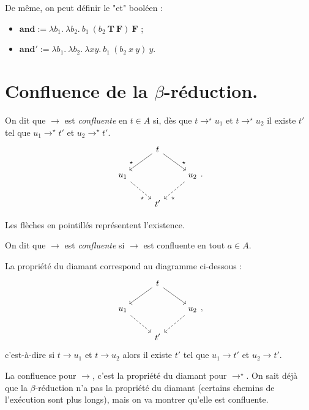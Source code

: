 \documentclass[./main]{subfiles}
\begin{document}
  De même, on peut définir le "et" booléen :
  \begin{itemize}
    \item $\mathbf{and} := \lambda b_1. \: \lambda b_2. \: b_1\: (b_2\: \mathbf{T}\: \mathbf{F})\: \mathbf{F}$ ;
    \item $\mathbf{and}' := \lambda b_1. \:\lambda b_2.\: \lambda x y. \: b_1 \: (b_2 \: x \: y) \: y$.
  \end{itemize}

  \section{Confluence de la $\beta$-réduction.}

  \begin{defn}
    On dit que $\to$ est \textit{confluente} en $t \in A$ si, dès que $t \to^\star u_1$ et $t \to^\star u_2$ il existe $t'$ tel que $u_1 \to^\star t'$ et $u_2 \to^\star t'$.
    \[
    \begin{tikzcd}
      & t \arrow[near end]{dr}{\star} \arrow[near end,swap]{dl}{\star}\\
      u_1 \arrow[near end,swap,dashed]{dr}{\star} && u_2 \arrow[near end,dashed]{dl}{\star}\\
      & t'
    \end{tikzcd}
    .\]

    Les flèches en pointillés représentent l'existence.

    On dit que $\to$ est \textit{confluente} si $\to $ est confluente en tout $a \in A$.

    La propriété du diamant correspond au diagramme ci-dessous :
    \[
    \begin{tikzcd}
      & t \arrow[near end]{dr}{} \arrow[near end,swap]{dl}{}\\
      u_1 \arrow[near end,swap,dashed]{dr}{} && u_2 \arrow[near end,dashed]{dl}{}\\
      & t'
    \end{tikzcd}
    ,\]
    c'est-à-dire si $t \to u_1$ et $t\to u_2$ alors il existe $t'$ tel que $u_1 \to t'$ et $u_2 \to t'$.
  \end{defn}

  La confluence pour $\to$, c'est la propriété du diamant pour $\to^\star$.
  On sait déjà que la $\beta$-réduction n'a pas la propriété du diamant (certains chemins de l'exécution sont plus longs), mais on va montrer qu'elle est confluente.
\end{document}
